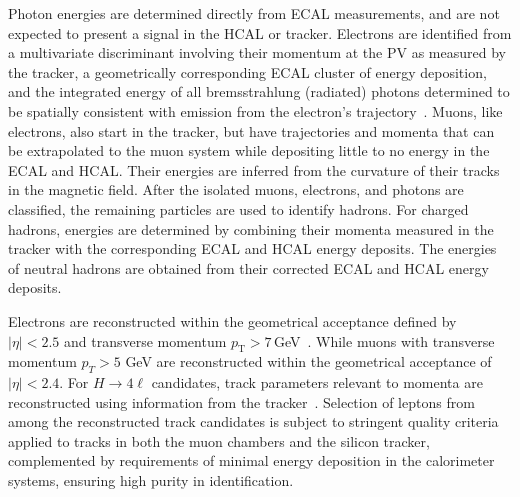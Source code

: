 Photon energies are determined directly from ECAL measurements, and are not expected to present a signal in the HCAL or tracker. Electrons are identified from a multivariate discriminant involving their momentum at the PV as measured by the tracker, a geometrically corresponding ECAL cluster of energy deposition, and the integrated energy of all bremsstrahlung (radiated) photons determined to be spatially consistent with emission from the electron's trajectory~\cite{Sirunyan:2021rug}. Muons, like electrons, also start in the tracker, but have trajectories and momenta that can be extrapolated to the muon system while depositing little to no energy in the ECAL and HCAL. Their energies are inferred from the curvature of their tracks in the magnetic field. After the isolated muons, electrons, and photons are classified, the remaining particles are used to identify hadrons. For charged hadrons, energies are determined by combining their momenta measured in the tracker with the corresponding ECAL and HCAL energy deposits. The energies of neutral hadrons are obtained from their corrected ECAL and HCAL energy deposits.

Electrons are reconstructed within the geometrical acceptance defined by $|\eta| < 2.5$ and transverse momentum $p_{\mathrm{T}} > 7$\,GeV~\cite{eleReco}. While muons with transverse momentum $p_T > 5$ GeV are reconstructed within the geometrical acceptance of $|\eta|< 2.4$. For $H \to 4\ell$ candidates, track parameters relevant to momenta are reconstructed using information from the tracker~\cite{MuReco}. Selection of leptons from among the reconstructed track candidates is subject to stringent quality criteria applied to tracks in both the muon chambers and the silicon tracker, complemented by requirements of minimal energy deposition in the calorimeter systems, ensuring high purity in identification.

